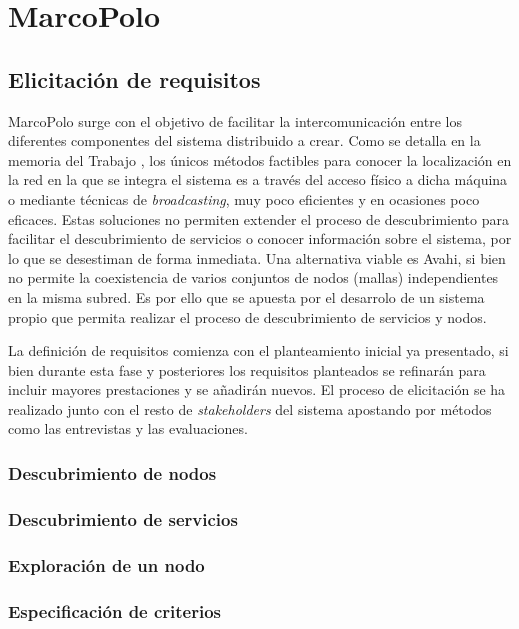 \chapter{MarcoPolo}

\section{Elicitación de requisitos}

MarcoPolo surge con el objetivo de facilitar la intercomunicación entre los diferentes componentes del sistema distribuido a crear. Como se detalla en la memoria del Trabajo %
, los únicos métodos factibles para conocer la localización en la red en la que se integra el sistema es a través del acceso físico a dicha máquina o mediante técnicas de \textit{broadcasting}, muy poco eficientes y en ocasiones poco eficaces. Estas soluciones no permiten extender el proceso de descubrimiento para facilitar el descubrimiento de servicios o conocer información sobre el sistema, por lo que se desestiman de forma inmediata. Una alternativa viable es Avahi, si bien no permite la coexistencia de varios conjuntos de nodos (mallas) independientes en la misma subred. Es por ello que se apuesta por el desarrolo de un sistema propio que permita realizar el proceso de descubrimiento de servicios y nodos.

La definición de requisitos comienza con el planteamiento inicial ya presentado, si bien durante esta fase y posteriores los requisitos planteados se refinarán para incluir mayores prestaciones y se añadirán nuevos. El proceso de elicitación se ha realizado junto con el resto de \textit{stakeholders} del sistema apostando por métodos como las entrevistas y las evaluaciones.

\subsection{Descubrimiento de nodos}

\subsection{Descubrimiento de servicios}

\subsection{Exploración de un nodo}

\subsection{Especificación de criterios}

